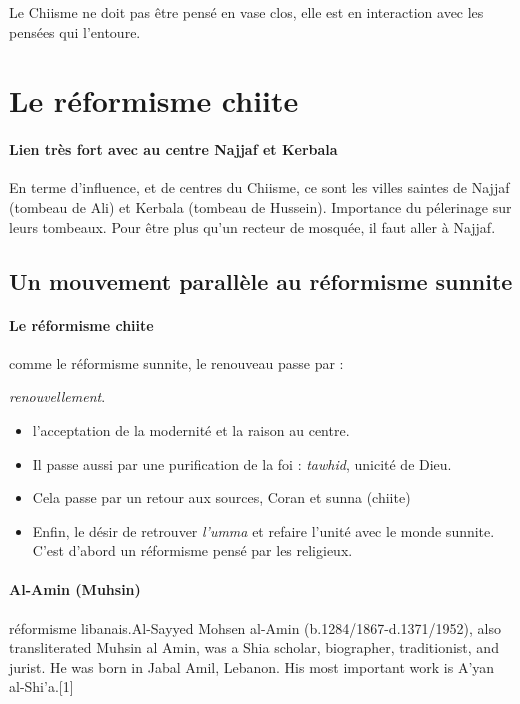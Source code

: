 Le Chiisme ne doit pas être pensé en vase clos, elle est en interaction avec les pensées qui l'entoure.

\section{Le réformisme chiite}
\label{le-ruxe9formisme-chiite}

  \paragraph{Lien très fort avec au centre Najjaf et Kerbala} En terme d'influence, et de centres du Chiisme, ce sont les villes saintes de Najjaf (tombeau de Ali) et Kerbala (tombeau de Hussein). Importance du pélerinage sur leurs tombeaux. 
  Pour être plus qu'un recteur de mosquée, il faut aller à Najjaf. 
  
  
     \subsection{Un mouvement parallèle au réformisme sunnite}

  \paragraph{Le réformisme chiite} comme le réformisme sunnite, le renouveau passe par :
  \begin{Def}[tajdid] 
\emph{renouvellement}.
\end{Def}

  \begin{itemize}
      \item   l'acceptation de la modernité et la raison au centre.
      \item   Il passe aussi par une purification de la foi : \emph{tawhid}, unicité de Dieu.
      \item Cela passe par un retour aux sources, Coran et sunna (chiite)
      \item Enfin, le désir de retrouver \emph{l'umma} et refaire l'unité avec le monde sunnite.
C'est d'abord un réformisme pensé par les religieux.
  \end{itemize}
  



\paragraph{Al-Amin (Muhsin)} réformisme libanais.Al-Sayyed Mohsen al-Amin (b.1284/1867-d.1371/1952), also transliterated Muhsin al Amin, was a Shia scholar, biographer, traditionist, and jurist. He was born in Jabal Amil, Lebanon. His most important work is A'yan al-Shi'a.[1] 

